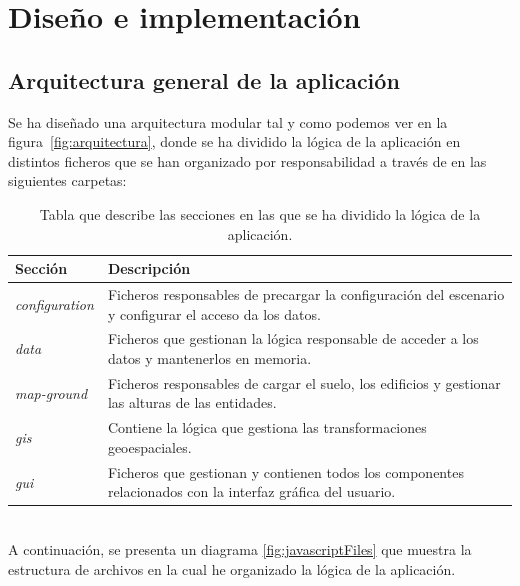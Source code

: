 \documentclass[a4paper, 11pt]{book}
\begin{document}

\clearpage


\chapter{Diseño e implementación}
\label{sec:diseno}
\section{Arquitectura general de la aplicación} 
\label{sec:arquitectura}
Se ha diseñado una arquitectura modular tal y como podemos ver en la figura~\ref{fig:arquitectura}, donde se ha dividido la lógica de la aplicación en distintos ficheros que se han organizado por responsabilidad a través de en las siguientes carpetas:
\begin{table}[h]
	\begin{center}
		\begin{tabular}{|l|p{13cm}|}
			\hline
			\textbf{Sección} & \textbf{Descripción} \\
			\hline
			\emph{configuration} & Ficheros responsables de precargar la configuración del escenario y configurar el acceso da los datos. \\\hline
			\emph{data} & Ficheros que gestionan la lógica responsable de acceder a los datos y mantenerlos en memoria. \\\hline
			\emph{map-ground} & Ficheros responsables de cargar el suelo, los edificios y gestionar las alturas de las entidades. \\\hline
			\emph{gis} & Contiene la lógica que gestiona las transformaciones geoespaciales. \\\hline
			\emph{gui} & Ficheros que gestionan y contienen todos los componentes relacionados con la interfaz gráfica del usuario.\\\hline
		\end{tabular}
		\caption{Tabla que describe las secciones en las que se ha dividido la lógica de la aplicación.}
	\end{center}
\end{table}
\\A continuación, se presenta un diagrama \ref{fig:javascriptFiles} que muestra la estructura de archivos en la cual he organizado la lógica de la aplicación. 
\end{document}
